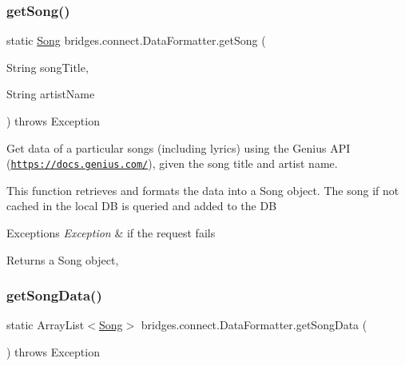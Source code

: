 \subsubsection{\texorpdfstring{get\+Song()}{getSong()}}
{\footnotesize\ttfamily static \mbox{\hyperlink{classbridges_1_1data__src__dependent_1_1_song}{Song}} bridges.\+connect.\+Data\+Formatter.\+get\+Song (\begin{DoxyParamCaption}\item[{String}]{song\+Title,  }\item[{String}]{artist\+Name }\end{DoxyParamCaption}) throws Exception\hspace{0.3cm}{\ttfamily [static]}}

Get data of a particular songs (including lyrics) using the Genius A\+PI (\href{https://docs.genius.com/}{\tt https\+://docs.\+genius.\+com/}), given the song title and artist name.

This function retrieves and formats the data into a Song object. The song if not cached in the local DB is queried and added to the DB


\begin{DoxyExceptions}{Exceptions}
{\em Exception} & if the request fails\\
\hline
\end{DoxyExceptions}
\begin{DoxyReturn}{Returns}
a Song object, 
\end{DoxyReturn}
\mbox{\label{classbridges_1_1connect_1_1_data_formatter_a6a2ded4ccec11234434b83a3e408fb67}} 
\subsubsection{\texorpdfstring{get\+Song\+Data()}{getSongData()}}
{\footnotesize\ttfamily static Array\+List$<$\mbox{\hyperlink{classbridges_1_1data__src__dependent_1_1_song}{Song}}$>$ bridges.\+connect.\+Data\+Formatter.\+get\+Song\+Data (\begin{DoxyParamCaption}{ }\end{DoxyParamCaption}) throws Exception\hspace{0.3cm}{\ttfamily [static]}}

